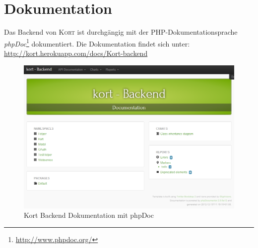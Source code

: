 \section{Dokumentation}

Das Backend von \textsc{Kort} ist durchgängig mit der PHP-Dokumentationsprache \emph{phpDoc}\footnote{\url{http://www.phpdoc.org/}} dokumentiert.
Die Dokumentation findet sich unter: \url{http://kort.herokuapp.com/docs/Kort-backend}

\begin{figure}[H]
	\centering
	\includegraphics[width=\textwidth]{images/implementation/backend/kort-backend-documentation}
	\caption{Kort Backend Dokumentation mit phpDoc}
	\label{image-kort-backend-documentation}
\end{figure}